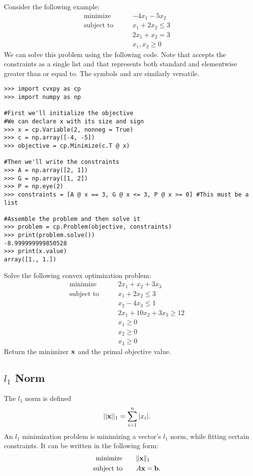 Consider the following example:
\begin{align*}
\text{minimize}\qquad &-4x_1-5x_2 \\
\text{subject to}\qquad &x_1+2x_2 \leq 3 \\
	        &2x_1+x_2 = 3 \\
		&x_1, x_2 \geq 0
\end{align*}
We can solve this problem using the following code.
Note that  accepts the constraints as a single list and that \li{>=} represents both standard and elementwise greater than or equal to.
The symbols \li{<=} and \li{==} are similarly versatile.

\begin{lstlisting}
>>> import cvxpy as cp
>>> import numpy as np

#First we'll initialize the objective
#We can declare x with its size and sign
>>> x = cp.Variable(2, nonneg = True)	
>>> c = np.array([-4, -5])
>>> objective = cp.Minimize(c.T @ x)

#Then we'll write the constraints
>>> A = np.array([2, 1])
>>> G = np.array([1, 2])
>>> P = np.eye(2)
>>> constraints = [A @ x == 3, G @ x <= 3, P @ x >= 0] #This must be a list

#Assemble the problem and then solve it
>>> problem = cp.Problem(objective, constraints)
>>> print(problem.solve())
-8.999999999850528
>>> print(x.value)
array([1., 1.])
\end{lstlisting}

\begin{problem}
Solve the following convex optimization problem:
\begin{align*}
\text{minimize}\qquad &2x_1+x_2+3x_3 \\
\text{subject to}\qquad &x_1+2x_2 \leq 3 \\
		&x_2-4x_3\leq 1\\
	        &2x_1+10x_2+3x_3 \geq 12 \\
		&x_1 \geq 0 \\
		&x_2 \geq 0 \\
		&x_3 \geq 0
\end{align*}
Return the minimizer $\mathbf{x}$ and the primal objective value.
\end{problem}
\pagebreak
\subsection*{$l_1$ Norm}
The $l_1$ norm is defined 
\[||\mathbf{x}||_1=\sum_{i=1}^n |x_i|.\]
An $l_1$ minimization problem is minimizing a vector's $l_1$ norm, while fitting certain constraints. It can be written in the following form:
\begin{align*}
\text{minimize}\qquad &\|\mathbf{x}\|_1\\
\text{subject to} \qquad &A\mathbf{x} = \mathbf{b}.
\end{align*}


